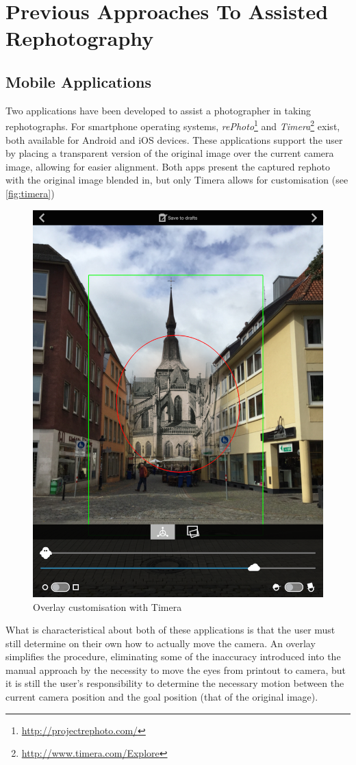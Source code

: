 \section{Previous Approaches To Assisted Rephotography}

\subsection{Mobile Applications}\label{subsec:mobile_apps}

Two applications have been developed to assist a photographer in taking
rephotographs. For smartphone operating systems,
\emph{rePhoto}\footnote{\url{http://projectrephoto.com/}} and
\emph{Timera}\footnote{\url{http://www.timera.com/Explore}} exist, both
available for Android and iOS devices. These applications support the user by placing a transparent
version of the original image over the current camera image, allowing for easier
alignment. 
Both apps present the captured rephoto with the original image blended in, but
only Timera allows for customisation (see \autoref{fig:timera})

\begin{figure}
   {\centering      
   \includegraphics[width=.5\textwidth]{gfx/timera.PNG}
   \caption{Overlay customisation with Timera}
   \label{fig:timera}}
\end{figure}

What is characteristical about both of these applications is that the user must still
determine on their own how to actually move the camera. An overlay simplifies
the procedure, eliminating some of the inaccuracy introduced into the manual approach by the
necessity to move the eyes from printout to camera, but it is still the user's
responsibility to determine the necessary motion between the current camera
position and the goal position (that of the original image). 

